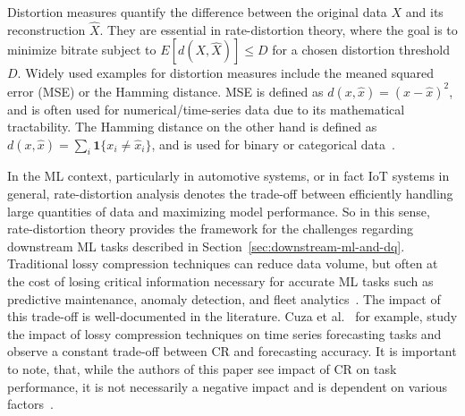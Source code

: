 Distortion measures quantify the difference between the original data $X$ and its reconstruction $\hat{X}$. They are essential in rate-distortion theory, where the goal is to minimize bitrate subject to $E[d(X,\hat{X})] \leq D$ for a chosen distortion threshold $D$. Widely used examples for distortion measures include the meaned squared error (MSE) or the Hamming distance. MSE is defined as $d(x,\hat{x}) = {(x - \hat{x})}^2$, and is often used for numerical/time-series data due to its mathematical tractability. The Hamming distance on the other hand is defined as $d(x,\hat{x}) = \sum_i \mathbf{1}\{x_i \neq \hat{x}_i\}$, and is used for binary or categorical data~\cite[pp.~304--305]{Cover2006}.

In the ML context, particularly in automotive systems, or in fact IoT systems in general, rate-distortion analysis denotes the trade-off between efficiently handling large quantities of data and maximizing model performance. So in this sense, rate-distortion theory provides the framework for the challenges regarding downstream ML tasks described in Section~\ref{sec:downstream-ml-and-dq}. Traditional lossy compression techniques can reduce data volume, but often at the cost of losing critical information necessary for accurate ML tasks such as predictive maintenance, anomaly detection, and fleet analytics~\cite{Marchioni2024}. The impact of this trade-off is well-documented in the literature. Cuza et al.~\cite{Cuza2024} for example, study the impact of lossy compression techniques on time series forecasting tasks and observe a constant trade-off between CR and forecasting accuracy. It is important to note, that, while the authors of this paper see impact of CR on task performance, it is not necessarily a negative impact and is dependent on various factors~\cite[pp.~654--655]{Cuza2024}.

